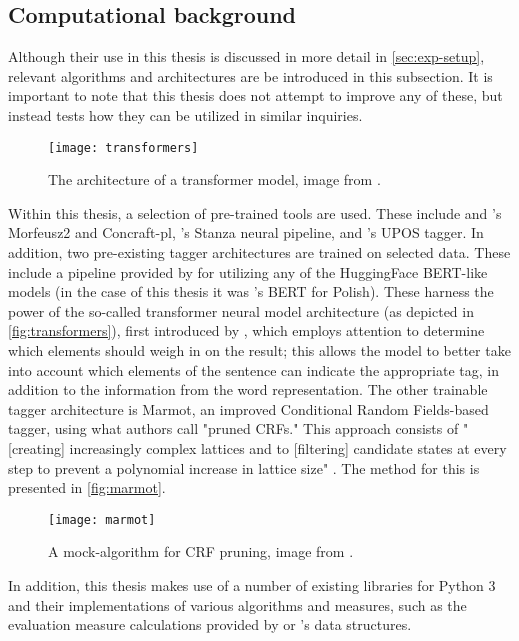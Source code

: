 \subsection{Computational background}
\label{subsec:algorithms}

Although their use in this thesis is discussed in more detail in \autoref{sec:exp-setup}, relevant algorithms and architectures are be introduced in this subsection. It is important to note that this thesis does not attempt to improve any of these, but instead tests how they can be utilized in similar inquiries. 

\begin{figure}[H]
\centering
\texttt{[image: transformers]}
\caption{\label{fig:transformers} The architecture of a transformer model, image from \citet{vaswani2017attention}.}
\end{figure}

Within this thesis, a selection of pre-trained tools are used. These include \cite{waszczuk-2012-harnessing} and \citet{kie:wol:17:morf}'s Morfeusz2 and Concraft-pl, \citet{qi2020stanza}'s Stanza neural pipeline, and \citet{gatecloud}'s UPOS tagger. In addition, two pre-existing tagger architectures are trained on selected data. These include a pipeline provided by \citet{wolf-etal-2020-transformers} for utilizing any of the HuggingFace BERT-like models (in the case of this thesis it was \citet{kłeczek_2021}'s BERT for Polish). These harness the power of the so-called transformer neural model architecture (as depicted in \autoref{fig:transformers}), first introduced by \citet{vaswani2017attention}, which employs attention to determine which elements should weigh in on the result; this allows the model to better take into account which elements of the sentence can indicate the appropriate tag, in addition to the information from the word representation. The other trainable tagger architecture is Marmot, an improved Conditional Random Fields-based tagger, using what authors call "pruned CRFs." This approach consists of "[creating] increasingly complex lattices and to [filtering] candidate states at every step to prevent a polynomial increase in lattice size" \citep{mueller-etal-2013-efficient}. The method for this is presented in \autoref{fig:marmot}. 

\begin{figure}[H]
\centering
\texttt{[image: marmot]}
\caption{\label{fig:marmot} A mock-algorithm for CRF pruning, image from \citet{mueller-etal-2013-efficient}.}
\end{figure}

In addition, this thesis makes use of a number of existing libraries for Python 3 and their implementations of various algorithms and measures, such as the evaluation measure calculations provided by \citet{scikit-learn} or \citet{reback2020pandas}'s data structures. 







